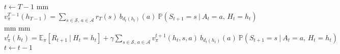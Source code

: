 \documentclass{standalone}
\begin{document}
	\begin{varwidth}{1.5\linewidth}
		\par\noindent
		\begin{algorithmic}[1]
			\State $t\gets T-1$
			 mm
				\State $\displaystyle v^{T-1}_\pi(h_{T-1}) = \sum_{s\in\mathcal{S}, \, a\in\mathcal{A}} r_T(s)\: b_{d_t(h_t)}(a) \: \mathbb{P}(S_{t+1} = s\:|\: A_{t}=a, \, H_t = h_t)$
			\EndFor
			 mm
			 mm
			\State $\displaystyle v^t_\pi(h_t) = \mathbb{E}_{\pi}\left[R_{t+1}\:|\:H_t=h_t\right] +\gamma \sum_{s\in\mathcal{S}, \, a\in\mathcal{A}} v^{t+1}_\pi(h_t, s, a) \: b_{d_t(h_t)}(a)\: \mathbb{P}(S_{t+1} = s\:|\: A_{t}=a, \, H_t = h_t)$
			\EndFor
			\State $t\gets t - 1$
			\EndWhile
			\EndProcedure
		\end{algorithmic}
	\end{varwidth}
\end{document}

